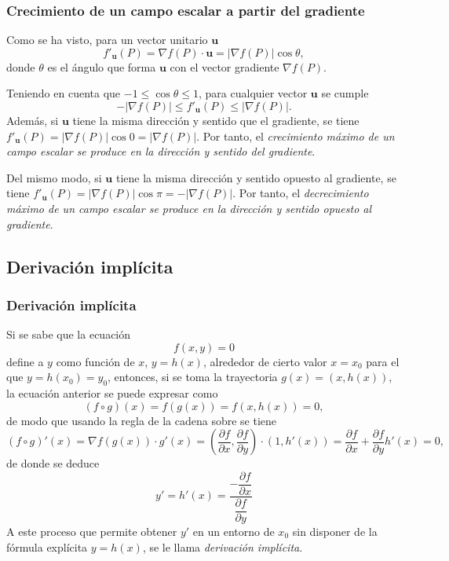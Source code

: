 \begin{frame}
\frametitle{Crecimiento de un campo escalar a partir del gradiente}
Como se ha visto, para un vector unitario $\mathbf{u}$
\[
f'_{\mathbf{u}}(P) = \nabla f(P)\cdot \mathbf{u} = |\nabla f(P)|\cos \theta,
\] 
donde $\theta$ es el ángulo que forma $\mathbf{u}$ con el vector gradiente $\nabla f(P)$.

Teniendo en cuenta que $-1\leq \cos\theta\leq 1$, para cualquier vector $\mathbf{u}$ se cumple 
\[
-|\nabla f(P)|\leq f'_{\mathbf{u}}(P)\leq |\nabla f(P)|.
\]
Además, si $\mathbf{u}$ tiene la misma dirección y sentido que el gradiente, se tiene $f'_{\mathbf{u}}(P)=|\nabla f(P)|\cos 0=|\nabla f(P)|$. 
Por tanto, el \alert{\emph{crecimiento máximo de un campo escalar se produce en la dirección y sentido del gradiente}}.

Del mismo modo, si $\mathbf{u}$ tiene la misma dirección y sentido opuesto al gradiente, se tiene $f'_{\mathbf{u}}(P)=|\nabla f(P)|\cos \pi=-|\nabla f(P)|$. 
Por tanto, el \alert{\emph{decrecimiento máximo de un campo escalar se produce en la dirección y sentido opuesto al gradiente}}.  
\end{frame}


\subsection{Derivación implícita}
\begin{frame}
\frametitle{Derivación implícita}
Si se sabe que la ecuación 
\[
f(x,y)=0
\]
define a $y$ como función de $x$, $y=h(x)$, alrededor de cierto valor $x=x_0$ para el que $y=h(x_0)=y_0$, entonces, si se toma la trayectoria $g(x)=(x,h(x))$, la ecuación anterior se puede expresar como
\[
(f\circ g)(x) = f(g(x)) = f(x,h(x))=0,
\]
de modo que usando la regla de la cadena sobre se tiene
\[
(f\circ g)'(x) = \nabla f(g(x))\cdot g'(x) = \left(\frac{\partial f}{\partial x}, \frac{\partial f}{\partial y}\right)\cdot (1,h'(x)) = 
\frac{\partial f}{\partial x}+\frac{\partial f}{\partial y}h'(x) = 0,
\] 
de donde se deduce
\[
y'=h'(x)=\frac{-\dfrac{\partial f}{\partial x}}{\dfrac{\partial f}{\partial y}}
\]
A este proceso que permite obtener $y'$ en un entorno de $x_0$ sin disponer de la fórmula explícita $y=h(x)$, se le llama \emph{derivación implícita}.
\end{frame}


